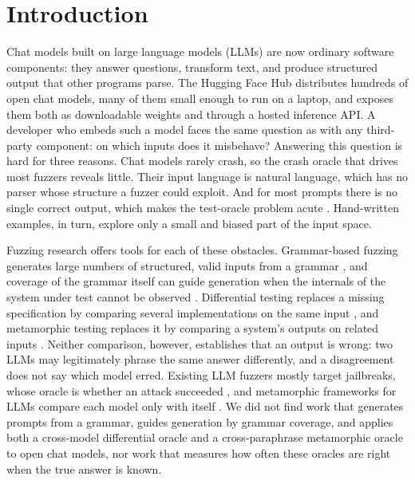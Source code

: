 \section{Introduction}

Chat models built on large language models (LLMs) are now ordinary software components: they answer questions, transform text, and produce structured output that other programs parse. The Hugging Face Hub distributes hundreds of open chat models, many of them small enough to run on a laptop, and exposes them both as downloadable weights and through a hosted inference API. A developer who embeds such a model faces the same question as with any third-party component: on which inputs does it misbehave? Answering this question is hard for three reasons. Chat models rarely crash, so the crash oracle that drives most fuzzers reveals little. Their input language is natural language, which has no parser whose structure a fuzzer could exploit. And for most prompts there is no single correct output, which makes the test-oracle problem acute \citep{barr2015oracle}. Hand-written examples, in turn, explore only a small and biased part of the input space.

Fuzzing research offers tools for each of these obstacles. Grammar-based fuzzing generates large numbers of structured, valid inputs from a grammar \citep{holler2012langfuzz}, and coverage of the grammar itself can guide generation when the internals of the system under test cannot be observed \citep{havrikov2019kpath}. Differential testing replaces a missing specification by comparing several implementations on the same input \citep{mckeeman1998differential}, and metamorphic testing replaces it by comparing a system's outputs on related inputs \citep{chen1998metamorphic}. Neither comparison, however, establishes that an output is wrong: two LLMs may legitimately phrase the same answer differently, and a disagreement does not say which model erred. Existing LLM fuzzers mostly target jailbreaks, whose oracle is whether an attack succeeded \citep{yu2023gptfuzzer}, and metamorphic frameworks for LLMs compare each model only with itself \citep{hyun2024metal,cho2025metamorphic}. We did not find work that generates prompts from a grammar, guides generation by grammar coverage, and applies both a cross-model differential oracle and a cross-paraphrase metamorphic oracle to open chat models, nor work that measures how often these oracles are right when the true answer is known.

